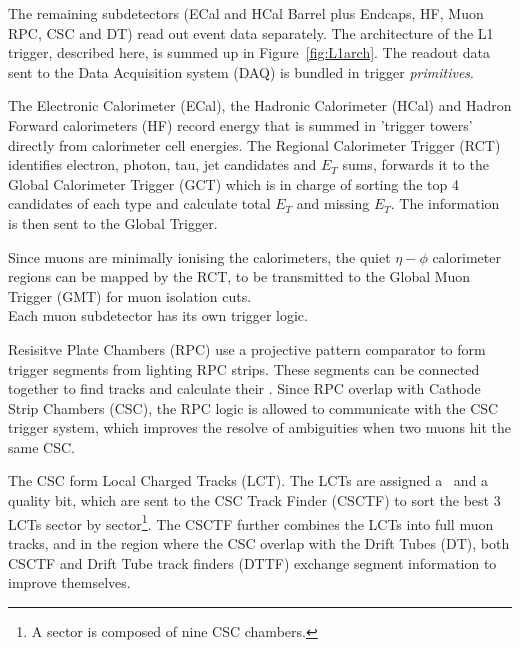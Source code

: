 The remaining subdetectors (ECal and HCal Barrel plus Endcaps, HF, Muon RPC,
CSC and DT) read out event data separately. The architecture of the L1 trigger, described here, is summed up in
Figure~\ref{fig:L1arch}. The readout data sent to the
Data Acquisition system (DAQ) is bundled in trigger
\textit{primitives}.


The Electronic Calorimeter (ECal), the Hadronic Calorimeter (HCal) and
Hadron Forward calorimeters (HF) record energy that is summed in 'trigger towers' directly from
calorimeter cell energies. The Regional Calorimeter Trigger (RCT)
identifies electron, photon, tau, jet candidates and $E_{T}$ sums, forwards
it to the Global Calorimeter Trigger (GCT) which is in charge of sorting the
top 4 candidates of each type and calculate total $E_{T}$ and missing
$E_{T}$. The information is then sent to the Global Trigger.

Since muons are minimally ionising the calorimeters, the quiet
$\eta-\phi$ calorimeter regions can be mapped by the RCT, to be
transmitted to the Global Muon Trigger (GMT) for muon isolation cuts.
\\
Each muon subdetector has its own trigger
logic.

Resisitve Plate Chambers (RPC) use a projective pattern comparator to form trigger segments from
lighting RPC strips. These segments can be connected together to
find tracks and calculate their \pt. Since RPC overlap with Cathode
Strip Chambers (CSC), the
RPC logic is allowed to communicate with the CSC trigger system, which
improves the resolve of ambiguities when two muons hit the same CSC. 

The CSC form Local Charged Tracks (LCT).  The LCTs are
assigned a \pt\ and a quality
bit, which are sent to the CSC Track Finder (CSCTF) to sort the best 3
LCTs sector by sector\footnote{A sector is composed of nine CSC chambers.}. The CSCTF further combines the LCTs into full muon tracks, and
in the region where the CSC overlap with the Drift Tubes (DT), both CSCTF and Drift Tube track finders (DTTF) exchange segment information to improve themselves.


